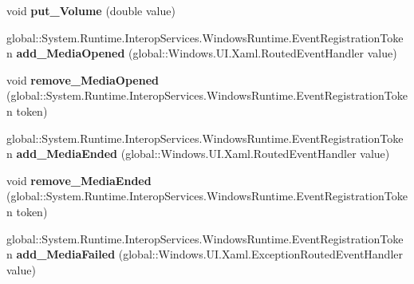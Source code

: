 \begin{DoxyCompactItemize}
void {\bfseries put\+\_\+\+Volume} (double value)
\item 
\mbox{\label{interface_windows_1_1_u_i_1_1_xaml_1_1_controls_1_1_i_media_element_af710ba32e5c086d5646e1a61e3a2bbaf}} 
global\+::\+System.\+Runtime.\+Interop\+Services.\+Windows\+Runtime.\+Event\+Registration\+Token {\bfseries add\+\_\+\+Media\+Opened} (global\+::\+Windows.\+U\+I.\+Xaml.\+Routed\+Event\+Handler value)
\item 
\mbox{\label{interface_windows_1_1_u_i_1_1_xaml_1_1_controls_1_1_i_media_element_ab974c092f3afe5c2c6eb21871e35d724}} 
void {\bfseries remove\+\_\+\+Media\+Opened} (global\+::\+System.\+Runtime.\+Interop\+Services.\+Windows\+Runtime.\+Event\+Registration\+Token token)
\item 
\mbox{\label{interface_windows_1_1_u_i_1_1_xaml_1_1_controls_1_1_i_media_element_a190c35f36005ac4360bc442c58c24107}} 
global\+::\+System.\+Runtime.\+Interop\+Services.\+Windows\+Runtime.\+Event\+Registration\+Token {\bfseries add\+\_\+\+Media\+Ended} (global\+::\+Windows.\+U\+I.\+Xaml.\+Routed\+Event\+Handler value)
\item 
\mbox{\label{interface_windows_1_1_u_i_1_1_xaml_1_1_controls_1_1_i_media_element_ae99093952bc4b7f856129d782cea9237}} 
void {\bfseries remove\+\_\+\+Media\+Ended} (global\+::\+System.\+Runtime.\+Interop\+Services.\+Windows\+Runtime.\+Event\+Registration\+Token token)
\item 
\mbox{\label{interface_windows_1_1_u_i_1_1_xaml_1_1_controls_1_1_i_media_element_ad3294027d9bad7858a991bb3a8b07ef8}} 
global\+::\+System.\+Runtime.\+Interop\+Services.\+Windows\+Runtime.\+Event\+Registration\+Token {\bfseries add\+\_\+\+Media\+Failed} (global\+::\+Windows.\+U\+I.\+Xaml.\+Exception\+Routed\+Event\+Handler value)
\item 
\mbox{\label{interface_windows_1_1_u_i_1_1_xaml_1_1_controls_1_1_i_media_element_afb81febce56b850ab6cff6148327aaea}} 

\end{DoxyCompactItemize}
